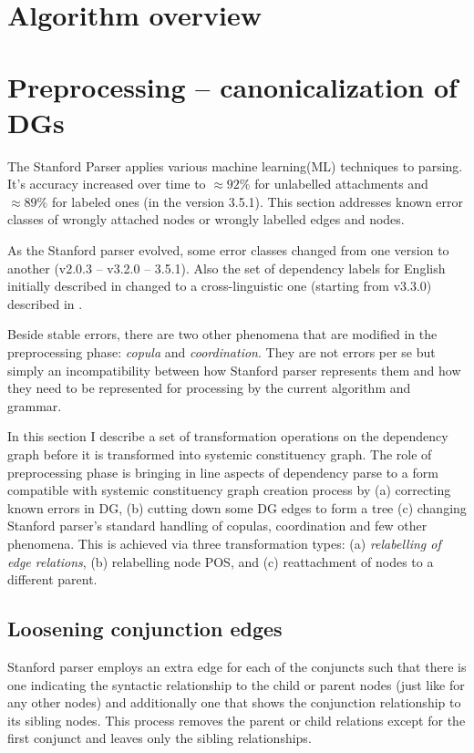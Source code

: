 \section{Algorithm overview}


\section{Preprocessing -- canonicalization of DGs}
\label{sec:preprocessing1}
The Stanford Parser applies various machine learning(ML) techniques to parsing. It's accuracy increased over time to $\approx92\%$ for unlabelled attachments and $\approx89\%$ for labeled ones (in the version 3.5.1). This section addresses known error classes of wrongly attached nodes or wrongly labelled edges and nodes. 

As the Stanford parser evolved, some error classes changed from one version to another (v2.0.3 -- v3.2.0 -- 3.5.1). Also the set of dependency labels for English initially described in \citep{Marneffe2008, Marneffe2008a} changed to a cross-linguistic one (starting from v3.3.0) described in \citep{Marneffe2014}. 

Beside stable errors, there are two other phenomena that are modified in the preprocessing phase: \textit{copula} and \textit{coordination}. They are not errors per se but simply an incompatibility between how Stanford parser represents them and how they need to be represented for processing by the current algorithm and grammar.

In this section I describe a set of transformation operations on the dependency graph before it is transformed into systemic constituency graph. The role of preprocessing phase is bringing in line aspects of dependency parse to a form compatible with systemic constituency graph creation process by (a) correcting known errors in DG, (b) cutting down some DG edges to form a tree (c) changing Stanford parser's standard handling of copulas, coordination and few other phenomena. This is achieved via three transformation types: (a) \textit{relabelling of edge relations}, (b) relabelling node POS, and (c) reattachment of nodes to a different parent. 

\subsection{Loosening conjunction edges}
Stanford parser employs an extra edge for each of the conjuncts such that there is one indicating the syntactic relationship to the child or parent nodes (just like for any other nodes) and additionally one that shows the conjunction relationship to its sibling nodes. This process removes the parent or child relations except for the first conjunct and leaves only the sibling relationships. 


